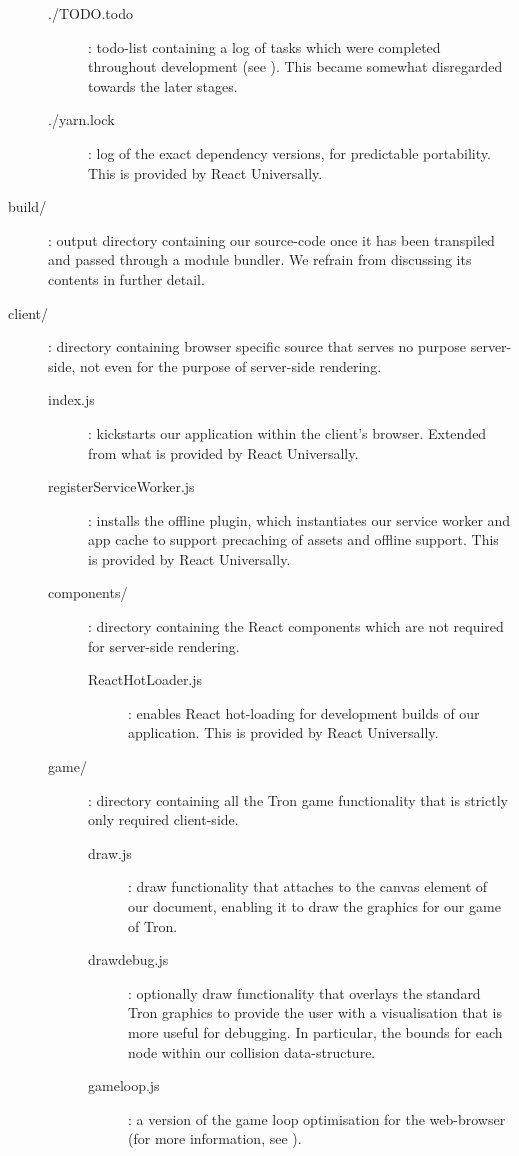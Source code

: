 \documentclass{standalone}
\begin{document}
\begin{formal}
\begin{description}
\begin{description}
	        	\item[./TODO.todo]: todo-list containing a log of tasks which were completed throughout development (see ). This became somewhat disregarded towards the later stages.

	        	\item[./yarn.lock]: log of the exact dependency versions, for predictable portability. This is provided by React Universally.
	      	\end{description}

	        \item[build/]: output directory containing our source-code once it has been transpiled and passed through a module bundler. We refrain from discussing its contents in further detail.

	      	\item[client/]: directory containing browser specific source that serves no purpose server-side, not even for the purpose of server-side rendering.
	        \begin{description}
	        	\item[index.js]: kickstarts our application within the client's browser. Extended from what is provided by React Universally.
	        	\item[registerServiceWorker.js]: installs the offline plugin, which instantiates our service worker and app cache to support precaching of assets and offline support. This is provided by React Universally.

		        \item[components/]: directory containing the React components which are not required for server-side rendering.
		      	\begin{description}
	        		\item[ReactHotLoader.js]: enables React hot-loading for development builds of our application. This is provided by React Universally.
        		\end{description}

		        \item[game/]: directory containing all the Tron game functionality that is strictly only required client-side.
		      	\begin{description}
		        	\item[draw.js]: draw functionality that attaches to the canvas element of our document, enabling it to draw the graphics for our game of Tron.
		        	\item[drawdebug.js]: optionally draw functionality that overlays the standard Tron graphics to provide the user with a visualisation that is more useful for debugging. In particular, the bounds for each node within our collision data-structure.
		        	\item[gameloop.js]: a version of the game loop optimisation for the web-browser (for more information, see ).


\end{description}
\end{description}
\end{description}
\end{formal}
\end{document}
